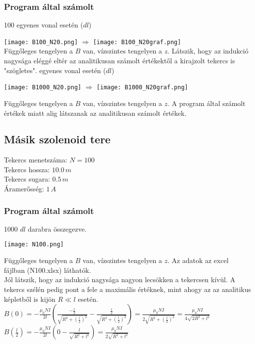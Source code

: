 \documentclass{article}
\begin{document}
\subsubsection{Program által számolt}
100 egyenes vonal esetén ($dl$)

\texttt{[image: B100\_N20.png]} $\Rightarrow$
\texttt{[image: B100\_N20graf.png]} \\
Függőleges tengelyen a $B$ van, vízszintes tengelyen a $z$.
\newline \newline
Látszik, hogy az indukció nagysága eléggé eltér az analitikusan számolt értékektől a kirajzolt tekercs is "szögletes".
\newline \newline \newline {} egyenes vonal esetén ($dl$)
\begin{center}
\texttt{[image: B1000\_N20.png]} $\Rightarrow$
\texttt{[image: B1000\_N20graf.png]}
\end{center}
Függőleges tengelyen a $B$ van, vízszintes tengelyen a $z$.
\newline \newline
A program által számolt értékek miatt alig látszanak az analitikusan számolt értékek.

\subsection*{Másik szolenoid tere}
Tekercs menetszáma: $N = 100$ \\
Tekercs hossza: $10.0 \, m$ \\
Tekercs sugara: $0.5 \, m$ \\
Áramerősség: $1 \, A$

\subsubsection{Program által számolt}
1000 $dl$ darabra összegezve.
\begin{center}
\texttt{[image: N100.png]}
\end{center}
Függőleges tengelyen a $B$ van, vízszintes tengelyen a $z$. \newline  \newline
Az adatok az excel fájlban (N100.xlsx) láthatók. \\
Jól látszik, hogy az indukció nagysága nagyon lecsökken a tekercsen kívül. A tekercs szélén pedig pont a fele a maximális értéknek, mint ahogy az az analitikus képletből is kijön $R \ll l$ esetén. \\
$\displaystyle B(0) =  -\frac{\mu_0 N I }{2l} \left( \frac{-\frac{l}{2}}{\sqrt{R^2 + (\frac{l}{2})^2}} - \frac{\frac{l}{2}}{\sqrt{R^2 + (\frac{l}{2})^2}} \right) = \frac{\mu_0 N I }{2\sqrt{R^2 + (\frac{l}{2})^2}} = \frac{\mu_0 N I }{4\sqrt{2R^2 + l^2}} $ \\
$\displaystyle B(\frac{l}{2}) =  -\frac{\mu_0 N I }{2l} \left( 0 - \frac{l}{\sqrt{R^2 + l^2}} \right) = \frac{\mu_0 N I }{2\sqrt{R^2 + l^2}} $
\end{document}
